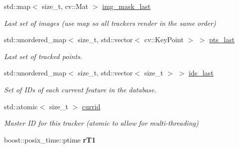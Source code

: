\begin{DoxyCompactItemize}
\mbox{\label{classov__core_1_1TrackBase_a744c43a93a6e4b5cbd9551280e6a1c97}} 
std\+::map$<$ size\+\_\+t, cv\+::\+Mat $>$ \hyperlink{classov__core_1_1TrackBase_a744c43a93a6e4b5cbd9551280e6a1c97}{img\+\_\+mask\+\_\+last}
\begin{DoxyCompactList}\small\item\em Last set of images (use map so all trackers render in the same order) \end{DoxyCompactList}\item 
\mbox{\label{classov__core_1_1TrackBase_ad44a9e0c34c63b477be5fd2a63a6fb61}} 
std\+::unordered\+\_\+map$<$ size\+\_\+t, std\+::vector$<$ cv\+::\+Key\+Point $>$ $>$ \hyperlink{classov__core_1_1TrackBase_ad44a9e0c34c63b477be5fd2a63a6fb61}{pts\+\_\+last}
\begin{DoxyCompactList}\small\item\em Last set of tracked points. \end{DoxyCompactList}\item 
\mbox{\label{classov__core_1_1TrackBase_aaf73cf7b7fd410d8532733875154ed2f}} 
std\+::unordered\+\_\+map$<$ size\+\_\+t, std\+::vector$<$ size\+\_\+t $>$ $>$ \hyperlink{classov__core_1_1TrackBase_aaf73cf7b7fd410d8532733875154ed2f}{ids\+\_\+last}
\begin{DoxyCompactList}\small\item\em Set of I\+Ds of each current feature in the database. \end{DoxyCompactList}\item 
\mbox{\label{classov__core_1_1TrackBase_af59db0441bf16f0e7c62d8f3bd09e5f0}} 
std\+::atomic$<$ size\+\_\+t $>$ \hyperlink{classov__core_1_1TrackBase_af59db0441bf16f0e7c62d8f3bd09e5f0}{currid}
\begin{DoxyCompactList}\small\item\em Master ID for this tracker (atomic to allow for multi-\/threading) \end{DoxyCompactList}\item 
\mbox{\label{classov__core_1_1TrackBase_a57cb2bb8f3c607f8b9d4bf2a602ac4e6}} 
boost\+::posix\+\_\+time\+::ptime {\bfseries r\+T1}
\item 
\mbox{\label{classov__core_1_1TrackBase_a73e38b621931e157aaa17495b53867b0}} 

\end{DoxyCompactItemize}
